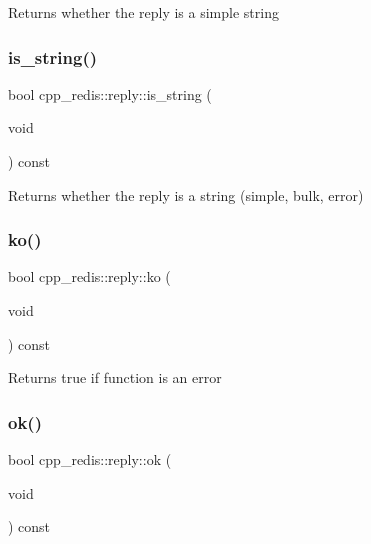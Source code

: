 \begin{DoxyReturn}{Returns}
whether the reply is a simple string 
\end{DoxyReturn}
\mbox{\label{classcpp__redis_1_1reply_a7072729490fdbad26ddeb02df8002147}} 
\subsubsection{\texorpdfstring{is\+\_\+string()}{is\_string()}}
{\footnotesize\ttfamily bool cpp\+\_\+redis\+::reply\+::is\+\_\+string (\begin{DoxyParamCaption}\item[{void}]{ }\end{DoxyParamCaption}) const}

\begin{DoxyReturn}{Returns}
whether the reply is a string (simple, bulk, error) 
\end{DoxyReturn}
\mbox{\label{classcpp__redis_1_1reply_a17e261cc8e7686bb2126d7df9223611a}} 
\subsubsection{\texorpdfstring{ko()}{ko()}}
{\footnotesize\ttfamily bool cpp\+\_\+redis\+::reply\+::ko (\begin{DoxyParamCaption}\item[{void}]{ }\end{DoxyParamCaption}) const}

\begin{DoxyReturn}{Returns}
true if function is an error 
\end{DoxyReturn}
\mbox{\label{classcpp__redis_1_1reply_a1270c4197e0ce79df996565f44011ac0}} 
\subsubsection{\texorpdfstring{ok()}{ok()}}
{\footnotesize\ttfamily bool cpp\+\_\+redis\+::reply\+::ok (\begin{DoxyParamCaption}\item[{void}]{ }\end{DoxyParamCaption}) const}

